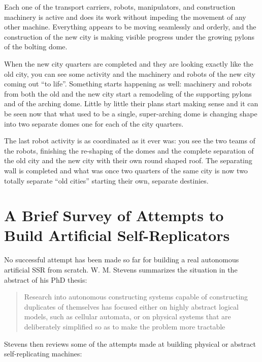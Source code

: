 Each one of the transport carriers, robots, manipulators, and
construction machinery is active and does its work without impeding the
movement of any other machine. Everything appears to be moving
seamlessly and orderly, and the construction of the new city is making
visible progress under the growing pylons of the bolting dome.

When the new city quarters are completed and they are looking exactly
like the old city, you can see some activity and the machinery and
robots of the new city coming out “to life”. Something starts happening
as well: machinery and robots from both the old and the new city start
a remodeling of the supporting pylons and of the arching dome. Little
by little their plans start making sense and it can be seen now that
what used to be a single, super-arching dome is changing shape into two
separate domes one for each of the city quarters.

The last robot activity is as coordinated as it ever was: you see the
two teams of the robots, finishing the re-shaping of the domes and the
complete separation of the old city and the new city with their own
round shaped roof. The separating wall is completed and what was 
once two quarters of the same city is now two totally separate “old cities” 
starting their own, separate destinies.

\section[Attempts to Build Artificial Self-Replicators]{A Brief Survey of Attempts to Build Artificial Self-Replicators}

No successful attempt has been made so far for building a real
autonomous artificial SSR from scratch. W. M. Stevens summarizes the
situation in the abstract of his PhD thesis:

\begin{quote}
Research into autonomous constructing systems capable of constructing
duplicates of themselves has focused either on highly abstract logical models, such as
cellular automata, or on physical systems that are deliberately simplified so as to make
the problem more tractable\citep{stevens2009}
\end{quote}

Stevens then reviews some of the attempts made at building physical or
abstract self-replicating machines:

